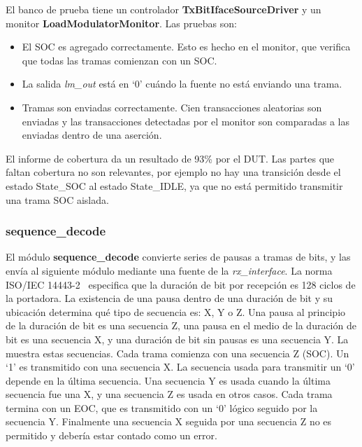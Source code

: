 \documentclass[a4paper, twoside, 11pt]{report}
\begin{document}
El banco de prueba tiene un controlador \textbf{TxBitIfaceSourceDriver} y un monitor \textbf{LoadModulatorMonitor}. Las pruebas son:

\begin{itemize}
  \item El SOC es agregado correctamente. Esto es hecho en el monitor, que verifica que todas las tramas comienzan con un SOC.
  \item La salida \textit{lm\_out} está en ‘0’ cuándo la fuente no está enviando una trama.
  \item Tramas son enviadas correctamente. Cien transacciones aleatorias son enviadas y las transacciones detectadas por el monitor son comparadas a las enviadas dentro de una aserción.
\end{itemize}

El informe de cobertura da un resultado de 93\% por el DUT. Las partes que faltan cobertura no son relevantes, por ejemplo no hay una transición desde el estado State\_SOC al estado State\_IDLE, ya que no está permitido transmitir una trama SOC aislada.

\FloatBarrier
\subsubsection{sequence\_decode}
\label{sec:sequence_decode}

El módulo \textbf{sequence\_decode} convierte series de pausas a tramas de bits, y las envía al siguiente módulo mediante una fuente de la \textit{rx\_interface}. La norma ISO/IEC 14443-2~\cite{iso14443-2} especifica que la duración de bit por recepción es 128 ciclos de la portadora. La existencia de una pausa dentro de una duración de bit y su ubicación determina qué tipo de secuencia es: X, Y o Z. Una pausa al principio de la duración de bit es una secuencia Z, una pausa en el medio de la duración de bit es una secuencia X, y una duración de bit sin pausas es una secuencia Y.  La  muestra estas secuencias. Cada trama comienza con una secuencia Z (SOC). Un ‘1’ es transmitido con una secuencia X. La secuencia usada para transmitir un ‘0’ depende en la última secuencia. Una secuencia Y es usada cuando la última secuencia fue una X, y una secuencia Z es usada en otros casos. Cada trama termina con un EOC, que es transmitido con un ‘0’ lógico seguido por la secuencia Y. Finalmente una secuencia X seguida por una secuencia Z no es permitido y debería estar contado como un error.
\end{document}
